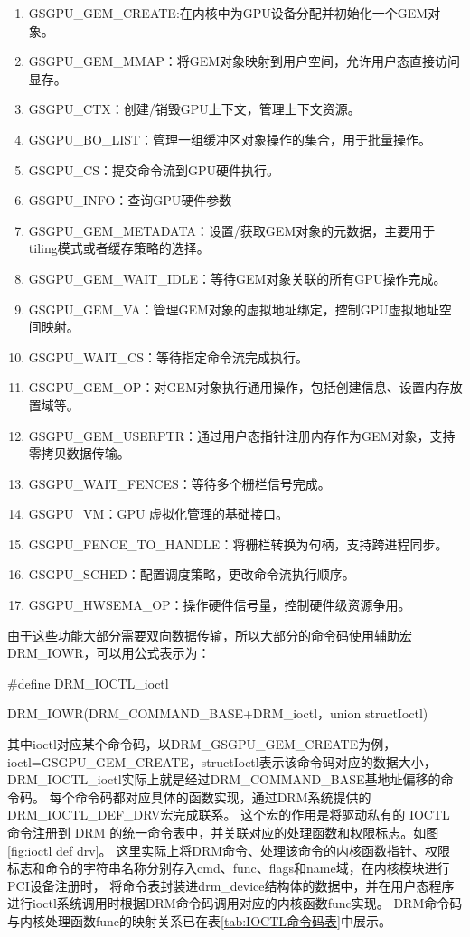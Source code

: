 \begin{enumerate}[1)]
  \item GSGPU\_GEM\_CREATE:在内核中为GPU设备分配并初始化一个GEM对象。
  \item GSGPU\_GEM\_MMAP：将GEM对象映射到用户空间，允许用户态直接访问显存。
  \item GSGPU\_CTX：创建/销毁GPU上下文，管理上下文资源。
  \item GSGPU\_BO\_LIST：管理一组缓冲区对象操作的集合，用于批量操作。
  \item GSGPU\_CS：提交命令流到GPU硬件执行。
  \item GSGPU\_INFO：查询GPU硬件参数
  \item GSGPU\_GEM\_METADATA：设置/获取GEM对象的元数据，主要用于tiling模式或者缓存策略的选择。
  \item GSGPU\_GEM\_WAIT\_IDLE：等待GEM对象关联的所有GPU操作完成。
  \item GSGPU\_GEM\_VA：管理GEM对象的虚拟地址绑定，控制GPU虚拟地址空间映射。
  \item GSGPU\_WAIT\_CS：等待指定命令流完成执行。
  \item GSGPU\_GEM\_OP：对GEM对象执行通用操作，包括创建信息、设置内存放置域等。
  \item GSGPU\_GEM\_USERPTR：通过用户态指针注册内存作为GEM对象，支持零拷贝数据传输。
  \item GSGPU\_WAIT\_FENCES：等待多个栅栏信号完成。
  \item GSGPU\_VM：GPU 虚拟化管理的基础接口。
  \item GSGPU\_FENCE\_TO\_HANDLE：将栅栏转换为句柄，支持跨进程同步。
  \item GSGPU\_SCHED：配置调度策略，更改命令流执行顺序。
  \item GSGPU\_HWSEMA\_OP：操作硬件信号量，控制硬件级资源争用。
\end{enumerate}
由于这些功能大部分需要双向数据传输，所以大部分的命令码使用辅助宏DRM\_IOWR，可以用公式表示为：

\#define DRM\_IOCTL\_ioctl

 DRM\_IOWR(DRM\_COMMAND\_BASE+DRM\_ioctl，union structIoctl)

其中ioctl对应某个命令码，以DRM\_GSGPU\_GEM\_CREATE为例，ioctl=GSGPU\_GEM\_CREATE，structIoctl表示该命令码对应的数据大小，
DRM\_IOCTL\_ioctl实际上就是经过DRM\_COMMAND\_BASE基地址偏移的命令码。
每个命令码都对应具体的函数实现，通过DRM系统提供的DRM\_IOCTL\_DEF\_DRV宏完成联系。
这个宏的作用是将驱动私有的 IOCTL 命令注册到 DRM 的统一命令表中，并关联对应的处理函数和权限标志。如图\ref{fig:ioctl def drv}。
这里实际上将DRM命令、处理该命令的内核函数指针、权限标志和命令的字符串名称分别存入cmd、func、flags和name域，在内核模块进行PCI设备注册时，
将命令表封装进drm\_device结构体的数据中，并在用户态程序进行ioctl系统调用时根据DRM命令码调用对应的内核函数func实现。
DRM命令码与内核处理函数func的映射关系已在表\ref{tab:IOCTL命令码表}中展示。

